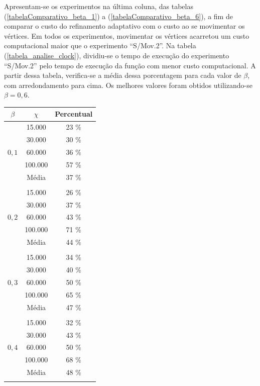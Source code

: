 Apresentam-se os experimentos na última coluna, das tabelas (\ref{tabelaComparativo_beta_1}) a (\ref{tabelaComparativo_beta_6}), a fim de comparar o custo do refinamento adaptativo com o custo ao se movimentar os vértices.  Em todos os experimentos, movimentar os vértices acarretou um custo computacional maior que o experimento ``S/Mov.2''. Na tabela (\ref{tabela_analise_clock}), dividiu-se o tempo de execução do experimento ``S/Mov.2'' pelo tempo de execução da função com menor custo computacional. A partir dessa tabela, verifica-se a média dessa porcentagem para cada valor de $\beta$, com arredondamento para cima. Os melhores valores foram obtidos utilizando-se $\beta = 0,6$. 

\begin{table}[!ht]
\begin{center}
\begin{tabular}{ccc}
\hline
$\beta$ & $\chi$ & Percentual \\
\hline
\multirow{5}{*}{$0,1$}  
& 15.000  & 23 \% \\
& 30.000  & 30 \% \\
& 60.000  & 36 \% \\
& 100.000 & 57 \% \\
\hline              
& Média & 37 \% \\
& & \\          
\multirow{5}{*}{$0,2$}  
& 15.000  & 26  \% \\
& 30.000  & 37  \% \\
& 60.000  & 43  \% \\
& 100.000 & 71  \% \\
\hline              
& Média & 44 \% \\
& & \\        
\multirow{5}{*}{$0,3$} 
& 15.000  & 34  \% \\
& 30.000  & 40  \% \\
& 60.000  & 50  \% \\
& 100.000 & 65  \% \\
\hline              
& Média & 47 \% \\
& & \\   
\multirow{5}{*}{$0,4$} 
& 15.000  & 32 \% \\
& 30.000  & 43 \% \\
& 60.000  & 50 \% \\
& 100.000 & 68 \% \\
\hline              
& Média & 48 \% \\
& & \\   

\end{tabular}
\end{center}
\end{table}

